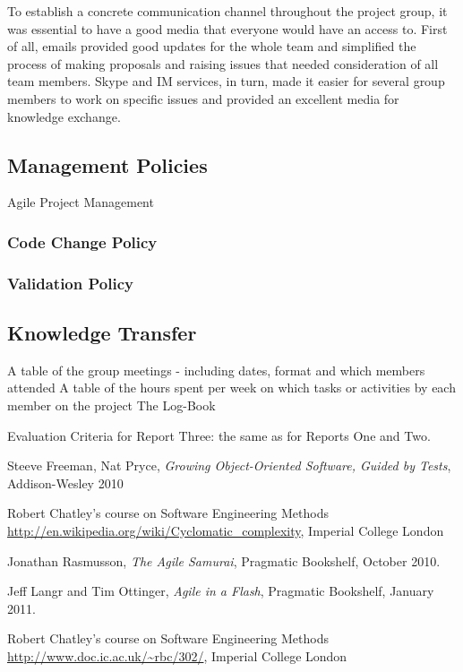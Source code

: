 \documentclass[10pt]{article}
\begin{document}
To establish a concrete communication channel throughout the project group, it was essential to have a good media that everyone would have an access to. First of all, emails provided good updates for the whole team and simplified the process of making proposals and raising issues that needed consideration of all team members. Skype and IM services, in turn, made it easier for several group members to work on specific issues and provided an excellent media for knowledge exchange.

\subsection{Management Policies}

Agile Project Management

\subsubsection{Code Change Policy}

\subsubsection{Validation Policy}

\subsection{Knowledge Transfer}


A table of the group meetings - including dates, format and which members attended
A table of the hours spent per week on which tasks or activities by each member on the project
The Log-Book


Evaluation Criteria for Report Three: the same as for Reports One and Two.

\begin{thebibliography}{9}
  Steeve Freeman, Nat Pryce,
  \emph{Growing Object-Oriented Software, Guided by Tests}, Addison-Wesley 2010

  Robert Chatley's course on Software Engineering Methods
  \url{http://en.wikipedia.org/wiki/Cyclomatic_complexity},
  Imperial College London

  Jonathan Rasmusson,
  \emph{The Agile Samurai},
  Pragmatic Bookshelf,
  October 2010.

  Jeff Langr and Tim Ottinger,
  \emph{Agile in a Flash},
  Pragmatic Bookshelf, 
  January 2011.

  Robert Chatley's course on Software Engineering Methods
  \url{http://www.doc.ic.ac.uk/~rbc/302/},
  Imperial College London

\end{thebibliography}
\end{document}

